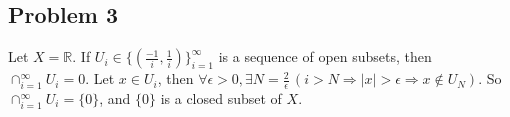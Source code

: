 \documentclass{article}
\begin{document}
\subsection*{Problem 3}
\begin{IEEEproof}
	Let \(X=\mathbb{R}\). If \(U_i\in\{(\frac{-1}{i},\frac{1}{i})\}_{i=1}^{\infty}\) is a sequence of open subsets, then \(\cap_{i=1}^{\infty}U_i={0}\). Let \(x\in U_i\), then \(\forall\epsilon>0,\exists N=\frac{2}{\epsilon}\,(i>N\Rightarrow \lvert x\rvert>\epsilon\Rightarrow x\notin U_N)\). So \(\cap_{i=1}^{\infty}U_i=\{0\}\), and \(\{0\}\) is a closed subset of \(X\).
\end{IEEEproof}
\end{document}

